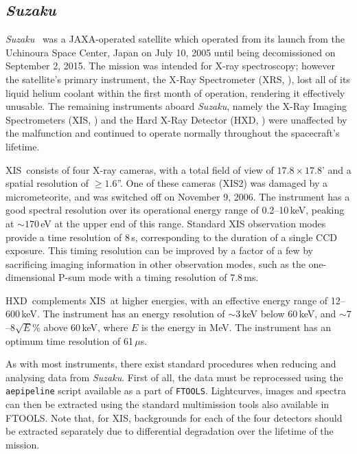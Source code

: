 \subsection{\textit{Suzaku}}

\par \textit{Suzaku}\indexsuzaku\ \citep{Mitsuda_Suzaku} was a JAXA-operated satellite which operated from its launch from the Uchinoura Space Center, Japan on July 10, 2005 until being decomissioned on September 2, 2015.  The mission was intended for X-ray spectroscopy; however the satellite's primary instrument, the X-Ray Spectrometer (XRS\indexxrs, \citealp{Kelley_XRS}), lost all of its liquid helium coolant within the first month of operation, rendering it effectively unusable.  The remaining instruments aboard \textit{Suzaku}, namely the X-Ray Imaging Spectrometers (XIS\indexxis, \citealp{Koyama_XIS}) and the Hard X-Ray Detector (HXD\indexhxd, \citealp{Takahashi_HXD}) were unaffected by the malfunction and continued to operate normally throughout the spacecraft's lifetime.
\par XIS\indexxis\ consists of four X-ray cameras, with a total field of view of $17.8\times17.8$' and a spatial resolution of $\geq1.6$''.  One of these cameras (XIS2) was damaged by a micrometeorite, and was switched off on November 9, 2006.  The instrument has a good spectral resolution over its operational energy range of 0.2--10\,keV, peaking at $\sim170$\,eV at the upper end of this range.  Standard XIS observation modes provide a time resolution of 8\,s, corresponding to the duration of a single CCD exposure.  This timing resolution can be improved by a factor of a few by sacrificing imaging information in other observation modes, such as the one-dimensional P-sum mode with a timing resolution of 7.8\,ms.
\par HXD\indexhxd\ complements XIS\indexxis\ at higher energies, with an effective energy range of 12--600\,keV.  The instrument has an energy resolution of $\sim3$\,keV below 60\,keV, and $\sim7$--$8\sqrt{E}$\% above 60\,keV, where $E$ is the energy in MeV.  The instrument has an optimum time resolution of 61\,$\mu$s.
\par As with most instruments, there exist standard procedures when reducing and analysing data from \textit{Suzaku}\indexsuzaku.  First of all, the data must be reprocessed using the \texttt{aepipeline} script available as a part of \texttt{FTOOLS}.  Lightcurves, images and spectra can then be extracted using the standard multimission tools also available in FTOOLS.  Note that, for XIS\indexxis, backgrounds for each of the four detectors should be extracted separately due to differential degradation over the lifetime of the mission.


